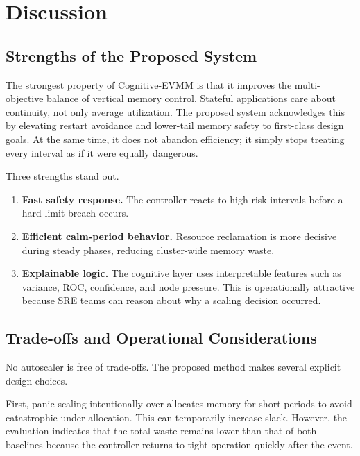 \documentclass[12pt,a4paper]{article}
\begin{document}
\section{Discussion}
\label{sec:discussion}

\subsection{Strengths of the Proposed System}

The strongest property of Cognitive-EVMM is that it improves the multi-objective balance of vertical memory control. Stateful applications care about continuity, not only average utilization. The proposed system acknowledges this by elevating restart avoidance and lower-tail memory safety to first-class design goals. At the same time, it does not abandon efficiency; it simply stops treating every interval as if it were equally dangerous.

Three strengths stand out.
\begin{enumerate}[label=\arabic*)]
    \item \textbf{Fast safety response.} The controller reacts to high-risk intervals before a hard limit breach occurs.
    \item \textbf{Efficient calm-period behavior.} Resource reclamation is more decisive during steady phases, reducing cluster-wide memory waste.
    \item \textbf{Explainable logic.} The cognitive layer uses interpretable features such as variance, ROC, confidence, and node pressure. This is operationally attractive because SRE teams can reason about why a scaling decision occurred.
\end{enumerate}

\subsection{Trade-offs and Operational Considerations}

No autoscaler is free of trade-offs. The proposed method makes several explicit design choices.

First, panic scaling intentionally over-allocates memory for short periods to avoid catastrophic under-allocation. This can temporarily increase slack. However, the evaluation indicates that the total waste remains lower than that of both baselines because the controller returns to tight operation quickly after the event.
\end{document}
